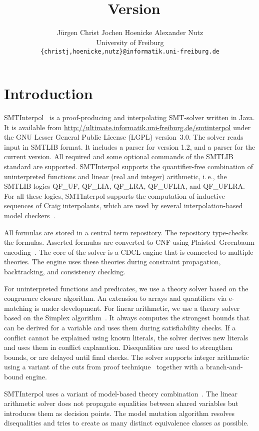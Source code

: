 \documentclass[11pt,a4paper]{easychair}
\title{\si\\{\large Version \version}}
\author{J\"urgen Christ \qquad Jochen Hoenicke \qquad Alexander Nutz\\
  University of Freiburg\\
  \texttt{\{christj,hoenicke,nutz\}@informatik.uni-freiburg.de}}
\newcommand\si{SMTInterpol\xspace}
\begin{document}
\maketitle
\section*{Introduction}
\si~\cite{smtinterpol} is a proof-producing and interpolating SMT-solver written in Java.  
It is available from 
\url{http://ultimate.informatik.uni-freiburg.de/smtinterpol}
under the GNU Lesser General Public License (LGPL) version~3.0.
The solver reads input in SMTLIB format.  It includes a parser for version
1.2, and a parser for the current version.  All required and some optional
commands of the SMTLIB standard are supported.
\si supports the quantifier-free combination of uninterpreted functions and
linear (real and integer) arithmetic, i.\,e., the SMTLIB logics QF\_UF,
QF\_LIA, QF\_LRA, QF\_UFLIA, and QF\_UFLRA.
For all these logics,
\si supports the computation of inductive sequences of Craig interpolants,
which are used by 
several interpolation-based model
checkers~\cite{HHP09,HHP10,DBLP:conf/vmcai/ErmisHP12}.

All formulas are stored in a central term repository.  The repository
type-checks the formulas.  Asserted formulas are converted to CNF using
Plaisted--Greenbaum encoding~\cite{DBLP:journals/jsc/PlaistedG86}.  The core
of the solver is a CDCL engine that is connected to multiple theories.  The
engine uses these theories during constraint propagation, backtracking, and
consistency checking.

For uninterpreted functions and predicates, we use a theory solver based on
the congruence closure algorithm.  An extension to arrays and quantifiers via
e-matching is under development.  For linear arithmetic, we use a theory
solver based on the Simplex algorithm~\cite{DBLP:conf/cav/DutertreM06}.  It
always computes the strongest bounds that can be derived for a variable and
uses them during satisfiability checks.  If a conflict cannot be explained
using known literals, the solver derives new literals and uses them in
conflict explanation.  Disequalities are used to
strengthen bounds, or are delayed until final checks.  The
solver supports integer arithmetic using a variant of the cuts from proof
technique~\cite{DBLP:conf/cav/DilligDA09} together with a branch-and-bound
engine.

\si uses a variant of model-based theory
combination~\cite{DBLP:journals/entcs/MouraB08}.  The linear arithmetic solver
does not propagate equalities between shared variables but introduces them as
decision points.  The model mutation algorithm resolves disequalities
and tries to create as many distinct equivalence classes as possible.
\end{document}
